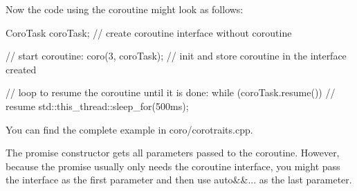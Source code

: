 Now the code using the coroutine might look as follows:

\begin{cpp}
CoroTask coroTask; // create coroutine interface without coroutine

// start coroutine:
coro(3, coroTask); // init and store coroutine in the interface created

// loop to resume the coroutine until it is done:
while (coroTask.resume()) { // resume
	std::this_thread::sleep_for(500ms);
}
\end{cpp}

You can find the complete example in coro/corotraits.cpp.

The promise constructor gets all parameters passed to the coroutine. However, because the promise usually only needs the coroutine interface, you might pass the interface as the first parameter and then use auto\&\&... as the last parameter.










